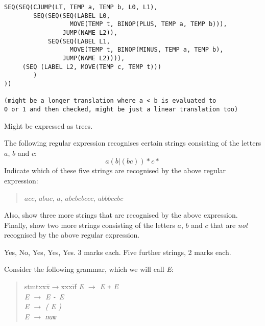\documentclass[11pt]{bareexam}
\begin{document}
\begin{questions}
\begin{subquestions}
\begin{modelanswer}
\begin{verbatim}
SEQ(SEQ(CJUMP(LT, TEMP a, TEMP b, L0, L1),
        SEQ(SEQ(SEQ(LABEL L0,
                  MOVE(TEMP t, BINOP(PLUS, TEMP a, TEMP b))),
                JUMP(NAME L2)),
            SEQ(SEQ(LABEL L1,
                  MOVE(TEMP t, BINOP(MINUS, TEMP a, TEMP b),
                JUMP(NAME L2)))),
     (SEQ (LABEL L2, MOVE(TEMP c, TEMP t)))
        )
))

(might be a longer translation where a < b is evaluated to 
0 or 1 and then checked, might be just a linear translation too)

\end{verbatim}
Might be expressed as trees.
\end{modelanswer}

\end{subquestions}

\newpage

\question

\begin{subquestions}

\subquestion
The following regular expression recognises certain strings consisting of the
letters $a$, $b$ and $c$:
\[
a(b|(bc))\!*c*
\]
Indicate which of these five strings are recognised by the above regular expression:
\begin{quote}
$acc$, $abac$, $a$, $abcbcbccc$, $abbbccbc$
\end{quote}
Also, show three more strings that are recognised by the above expression.
Finally, show two more strings consisting of 
the letters $a$, $b$ and $c$ that are \emph{not} 
recognised by the above regular expression.

\begin{modelanswer}
Yes, No, Yes, Yes, Yes. 3 marks each. 
Five further strings, 2 marks each.
\end{modelanswer}


\subquestion
Consider the following grammar, which we will call {\it E\/}:
\begin{quote}
\begin{tabbing}
stmtxxx\=$\rightarrow$xxx\=if\kill
\it
E \> $\rightarrow$ \> {\it E\/} \verb!+! {\it E} \\
\it
E \> $\rightarrow$ \> {\it E\/} \verb!-! {\it E} \\
\it
E \> $\rightarrow$ \> ( {\it E\/} ) \\
\it
E \> $\rightarrow$ \> \verb!num!
\end{tabbing}
\end{quote}


\end{subquestions}
\end{questions}
\end{document}
